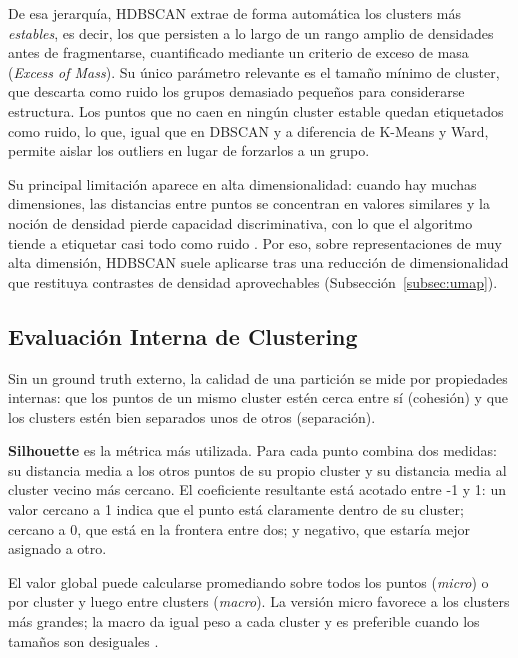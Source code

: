 De esa jerarquía, HDBSCAN extrae de forma automática los clusters más \textit{estables}, es decir, los que persisten a lo largo de un rango amplio de densidades antes de fragmentarse, cuantificado mediante un criterio de exceso de masa (\textit{Excess of Mass}). Su único parámetro relevante es el tamaño mínimo de cluster, que descarta como ruido los grupos demasiado pequeños para considerarse estructura. Los puntos que no caen en ningún cluster estable quedan etiquetados como ruido, lo que, igual que en DBSCAN y a diferencia de K-Means y Ward, permite aislar los outliers en lugar de forzarlos a un grupo.

Su principal limitación aparece en alta dimensionalidad: cuando hay muchas dimensiones, las distancias entre puntos se concentran en valores similares y la noción de densidad pierde capacidad discriminativa, con lo que el algoritmo tiende a etiquetar casi todo como ruido \parencite{aggarwal_2001_dimensionality}. Por eso, sobre representaciones de muy alta dimensión, HDBSCAN suele aplicarse tras una reducción de dimensionalidad que restituya contrastes de densidad aprovechables (Subsección~\ref{subsec:umap}).


\subsection{Evaluación Interna de Clustering}
\label{subsec:metricas-clustering}

Sin un ground truth externo, la calidad de una partición se mide por propiedades internas: que los puntos de un mismo cluster estén cerca entre sí (cohesión) y que los clusters estén bien separados unos de otros (separación).

\textbf{Silhouette} \parencite{rousseeuw_1987_silhouettes} es la métrica más utilizada. Para cada punto combina dos medidas: su distancia media a los otros puntos de su propio cluster y su distancia media al cluster vecino más cercano. El coeficiente resultante está acotado entre -1 y 1: un valor cercano a 1 indica que el punto está claramente dentro de su cluster; cercano a 0, que está en la frontera entre dos; y negativo, que estaría mejor asignado a otro.

El valor global puede calcularse promediando sobre todos los puntos (\textit{micro}) o por cluster y luego entre clusters (\textit{macro}). La versión micro favorece a los clusters más grandes; la macro da igual peso a cada cluster y es preferible cuando los tamaños son desiguales \parencite{chicco_2025_silhouette_db}.

